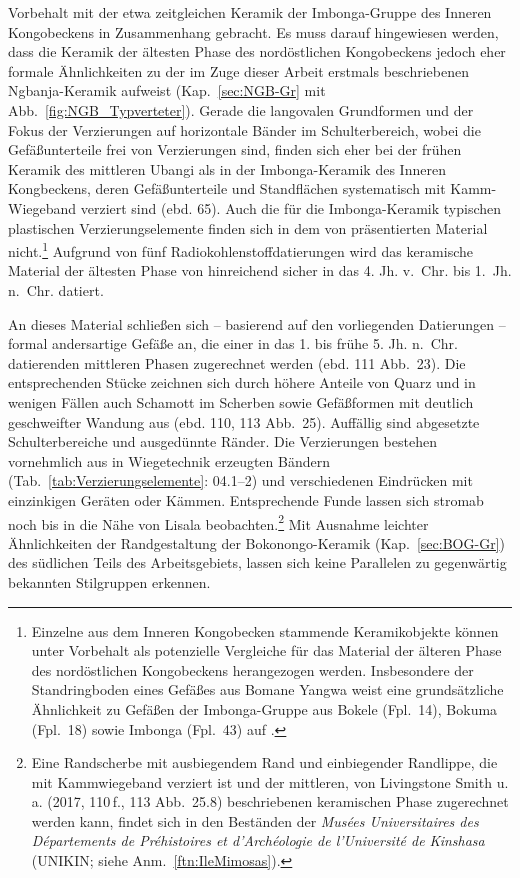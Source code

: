 Vorbehalt mit der etwa zeitgleichen Keramik der Imbonga-Gruppe des Inneren Kongobeckens \parencite[59--68]{Wotzka.1995} in Zusammenhang gebracht. Es muss darauf hingewiesen werden, dass die Keramik der ältesten Phase des nordöstlichen Kongobeckens jedoch eher formale Ähnlichkeiten zu der im Zuge dieser Arbeit erstmals beschriebenen \mbox{Ngbanja}-Keramik aufweist (Kap.~\ref{sec:NGB-Gr} mit Abb.~\ref{fig:NGB_Typverteter}). Gerade die langovalen Grundformen und der Fokus der Verzierungen auf horizontale Bänder im Schulterbereich, wobei die Gefäßunterteile frei von Verzierungen sind, finden sich eher bei der frühen Keramik des mittleren \mbox{Ubangi} als in der Imbonga-Keramik des Inneren Kongbeckens, deren Gefäßunterteile und Standflächen systematisch mit Kamm-Wiegeband verziert sind (ebd. 65). Auch die für die Imbonga-Keramik typischen plastischen Verzierungselemente finden sich in dem von \textcite[112 Abb.~24]{LivingstoneSmith.2017} präsentierten Material nicht.\footnote{Einzelne aus dem Inneren Kongobecken stammende Keramikobjekte können unter Vorbehalt als potenzielle Vergleiche für das Material der älteren Phase des nordöstlichen Kongobeckens herangezogen werden. Insbesondere der Standringboden eines Gefäßes aus Bomane Yangwa \parencites[14 Abb.~3]{LivingstoneSmith.2011} weist eine grundsätzliche Ähnlichkeit zu Gefäßen der Imbonga-Gruppe aus Bokele (Fpl.~14), Bokuma (Fpl.~18) sowie Imbonga (Fpl.~43) auf \parencite[453 Taf.~19.4, 6, 9, 470 Taf.~36.12, 471 Taf.~37.7, 490 Taf.~56.2]{Wotzka.1995}.} Aufgrund von fünf Radiokohlenstoffdatierungen wird das keramische Material der ältesten Phase von \textcite[111 Abb.~23]{LivingstoneSmith.2017} hinreichend sicher in das 4. Jh. v.~Chr. bis 1.~Jh. n.~Chr. datiert.

An dieses Material schließen sich -- basierend auf den vorliegenden Datierungen -- formal andersartige Gefäße an, die einer in das 1. bis frühe 5. Jh. n.~Chr. datierenden mittleren Phasen zugerechnet werden (ebd. 111 Abb.~23). Die entsprechenden Stücke zeichnen sich durch höhere Anteile von Quarz und in wenigen Fällen auch Schamott im Scherben sowie Gefäßformen mit deutlich geschweifter Wandung aus (ebd. 110, 113 Abb.~25). Auffällig sind abgesetzte Schulterbereiche und ausgedünnte Ränder. Die Verzierungen bestehen vornehmlich aus in Wiegetechnik erzeugten Bändern (Tab.~\ref{tab:Verzierungselemente}: 04.1--2) und verschiedenen Eindrücken mit einzinkigen Geräten oder Kämmen. Entsprechende Funde lassen sich stromab noch bis in die Nähe von Lisala beobachten.\footnote{Eine Randscherbe mit ausbiegendem Rand und einbiegender Randlippe, die mit Kammwiegeband verziert ist und der mittleren, von Livingstone Smith u.\,a. (2017, 110\,f., 113 Abb.~25.8) beschriebenen keramischen Phase zugerechnet werden kann, findet sich in den Beständen der \textit{Musées Universitaires des Départements de Préhistoires et d'Archéologie de l'Université de Kinshasa} (UNIKIN; siehe Anm.~\ref{ftn:IleMimosas}).} Mit Ausnahme leichter Ähnlichkeiten der Randgestaltung der Bokonongo-Keramik (Kap.~\ref{sec:BOG-Gr}) des südlichen Teils des Arbeitsgebiets, lassen sich keine Parallelen zu gegenwärtig bekannten Stilgruppen erkennen.

